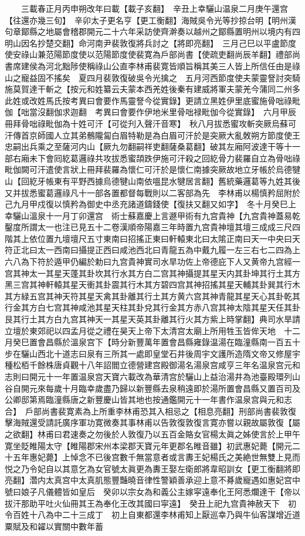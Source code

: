 　　三載春正月丙申朔改年曰載【載子亥翻】　辛丑上幸驪山温泉二月庚午還宫【往還亦幾三旬】　辛卯太子更名亨【更工衡翻】海賊吳令光等抄掠台明【明州漢句章鄮縣之地屬會稽郡開元二十六年采訪使齊澣奏以越州之鄮縣置明州以境内有四明山因名抄楚交翻】命河南尹裴敦復將兵討之【將即亮翻】　三月己巳以平盧節度使安祿山兼范陽節度使以范陽節度使裴寛為戶部尚書【使疏吏翻尚辰羊翻】禮部尚書席建侯為河北黜陟使稱祿山公直李林甫裴寛皆順旨稱其美三人皆上所信任由是祿山之寵益固不搖矣　夏四月裴敦復破吳令光擒之　五月河西節度使夫蒙靈詧討突騎施莫賀達干斬之【按元和姓纂云夫蒙本西羌姓後秦有建威將軍夫蒙羌今蒲同二州多此姓或改姓馬氏按考異曰會要作馬靈詧今從實錄】更請立黑姓伊里底蜜施骨咄祿毗伽【咄當沒翻伽求迦翻　考異曰會要作伊地米里骨咄禄毗伽今從實錄】　六月甲辰冊拜骨咄祿毗伽為十姓可汗【可從刋入聲汗音寒】　秋八月拔悉蜜攻斬突厥烏蘇可汗傳首京師國人立其弟鶻隴匐白眉特勒是為白眉可汗於是突厥大亂敇朔方節度使王忠嗣出兵乘之至薩河内山【厥九勿翻嗣祥吏翻薩桑葛翻】破其左廂阿波達干等十一部右廂未下會囘紇葛邏祿共攻拔悉蜜頡跌伊施可汗殺之回紇骨力裴羅自立為骨咄祿毗伽闕可汗遣使言狀上冊拜裴羅為懷仁可汗於是懷仁南據突厥故地立牙帳於烏德犍山【回紇牙帳東有平野西據烏德犍山南依嗢昆水犍居言翻】舊統藥邏葛等九姓其後又并拔悉蜜葛邏祿凡十一部各置都督每戰則以二客部為先　李林甫以楊慎矜屈附於己九月甲戍復以慎矜為御史中丞充諸道鑄錢使【復扶又翻又如字】　冬十月癸巳上幸驪山溫泉十一月丁卯還宫　術士蘇嘉慶上言遯甲術有九宫貴神【九宫貴神蓋易乾鑿度所謂太一也注已見五十二卷漢順帝陽嘉三年時置九宫貴神壇其壇三成成三尺四階其上依位置九壇壇尺五寸東南曰招搖正東曰軒轅東北曰太隂正南曰天一中央曰天符正北曰太一西南曰攝提正西曰咸池西北曰青龍五為中戴九履一左三右七二四為上六八為下符於遁甲仍編於勅曰九宫貴神實司水旱功佐上帝德庇下人又黄帝九宫經一宫其神太一其星天蓬其卦坎其行水其方白二宫其神攝提其星天内其卦坤其行土其方黑三宫其神軒轅其星天衝其卦震其行木其方碧四宫其神招搖其星天輔其卦巽其行木其方緑五宫其神天符其星天禽其卦離其行土其方黄六宫其神青龍其星天心其卦乾其行金其方白七宫其神咸池其星天柱其卦兌其行金其方赤八宫其神太陰其星天任其卦艮其行土其方白九宫其神天一其星天英其卦離其行火其方紫上時掌翻】典司水旱請立壇於東郊祀以四孟月從之禮在昊天上帝下太清宫太廟上所用牲玉皆侔天地　十二月癸巳置會昌縣於溫泉宫下【時分新豐萬年置會昌縣雍錄温湯在臨潼縣南一百五十步在驪山西北十道志曰泉有三所其一處即皇堂石井後周宇文護所造隋文帝又修屋宇種松栢千餘株唐貞觀十八年詔閻立德營建宫殿御湯名湯泉宫咸亨三年名温泉宫元和志則曰開元十一年置温泉宫天寶六載改為華清宫於驪山上益治湯井為池臺殿環列山谷自開元來每歲十月臨幸歲盡乃歸以新豐縣去泉稍遠即於湯所置會昌縣又置百司及公卿邸第焉臨潼縣唐之新豐慶山皆其地也按通鑑開元十一年書作温泉宫與元和志合】　戶部尚書裴寛素為上所重李林甫恐其入相忌之【相息亮翻】刑部尚書裴敦復擊海賊還受請託廣序軍功寛微奏其事林甫以告敦復敦復言寛亦嘗以親故屬敦復【屬之欲翻】林甫曰君速奏之勿後於人敦復乃以五百金賂女官楊太眞之姊使言於上甲午寛坐貶睢陽太守【睢陽郡宋州本梁郡天寶元年更郡名睢音雖】初武惠妃薨【開元二十五年惠妃薨】上悼念不已後宫數千無當意者或言夀王妃楊氏之美絶世無雙上見而悦之乃令妃自以其意乞為女官號太眞更為夀王娶左衛郎將韋昭訓女【更工衡翻將即亮翻】濳内太真宫中太真肌態豐豔曉音律性警穎善承迎上意不朞歲寵遇如惠妃宫中號曰娘子凡儀體皆如皇后　癸卯以宗女為和義公主嫁寜遠奉化王阿悉爛達干【帝以拔汗那助平吐火仙冊其王為奉化王改其國曰寜遠】　癸丑上祀九宫貴神赦天下　初令百姓十八為中二十三成丁　初上自東都還李林甫知上厭巡幸乃與牛仙客謀增近道粟賦及和糴以實關中數年蓄